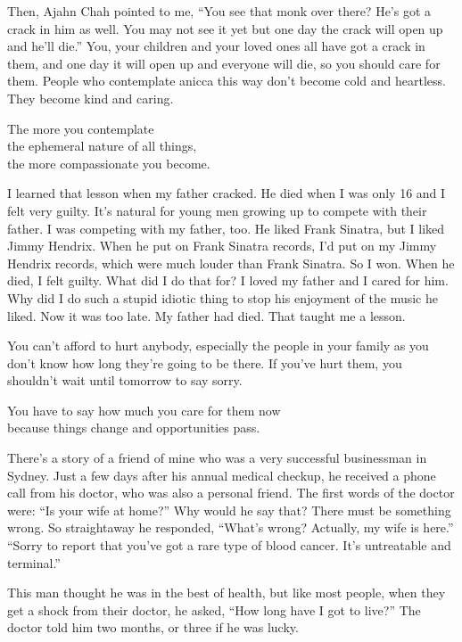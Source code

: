 \documentclass[12pt, openany]{book}
\newenvironment{aphorism}%
{%
\begin{center}\begin{itshape}
}%
{\end{itshape}\end{center}
}%
\begin{document}
Then, Ajahn Chah pointed to me, “You see that monk over there? He’s got a crack in him as well. You may not see it yet but one day the crack will open up and he’ll die.” You, your children and your loved ones all have got a crack in them, and one day it will open up and everyone will die, so you should care for them. People who contemplate anicca this way don’t become cold and heartless. They become kind and caring. 

\begin{aphorism}
The more you contemplate\\  
the ephemeral nature of all things,\\ 
the more compassionate you become.
\end{aphorism}

I learned that lesson when my father cracked. He died when I was only 16 and I felt very guilty. It’s natural for young men growing up to compete with their father. I was competing with my father, too. He liked Frank Sinatra, but I liked Jimmy Hendrix. When he put on Frank Sinatra records, I’d put on my Jimmy Hendrix records, which were much louder than Frank Sinatra. So I won. When he died, I felt guilty. What did I do that for? I loved my father and I cared for him. Why did I do such a stupid idiotic thing to stop his enjoyment of the music he liked. Now it was too late. My father had died. That taught me a lesson. 

You can’t afford to hurt anybody, especially the people in your family as you don’t know how long they’re going to be there. If you’ve hurt them, you shouldn’t wait until tomorrow to say sorry. 

\begin{aphorism}
You have to say how much you care for them now \\
because things change
 and opportunities pass.
\end{aphorism}

There’s a story of a friend of mine who was a very successful businessman in Sydney. Just a few days after his annual medical checkup, he received a phone call from his doctor, who was also a personal friend. The first words of the doctor were: “Is your wife at home?” Why would he say that? There must be something wrong. So straightaway he responded, “What’s wrong? Actually, my wife is here.” “Sorry to report that you’ve got a rare type of blood cancer. It’s untreatable and terminal.” 

This man thought he was in the best of health, but like most people, when they get a shock from their doctor, he asked, “How long have I got to live?” The doctor told him two months, or three if he was lucky. 
\end{document}
